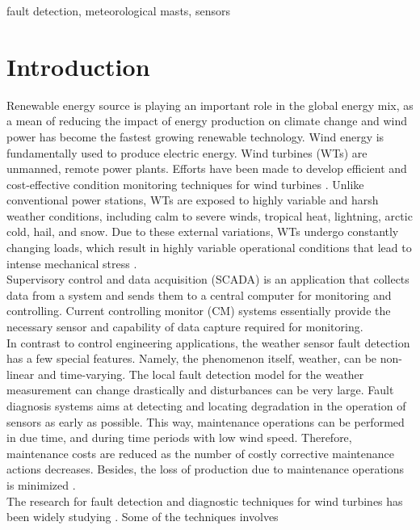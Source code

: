 \documentclass[conference]{IEEEtran}
\begin{document}
\begin{IEEEkeywords}
fault detection, meteorological masts, sensors
\end{IEEEkeywords}

\section{Introduction}
Renewable energy source is playing an important role in the global energy mix, as a mean of reducing the impact of energy production on climate change and wind power has become the fastest growing renewable technology. 
Wind energy is fundamentally used to produce electric energy. Wind turbines (WTs) are unmanned, remote power plants.  Efforts have been made to develop efficient and cost-effective condition monitoring techniques for wind turbines \cite{yang2014wind}. Unlike conventional power stations, WTs are exposed to highly variable and harsh weather conditions, including calm to severe winds, tropical heat, lightning, arctic cold, hail, and snow. Due to these external variations, WTs undergo constantly changing loads, which result in highly variable operational conditions that lead to intense mechanical stress \cite{ribrant2006thesis}. \\
Supervisory control and data acquisition (SCADA) is an application that collects data from a system and sends them to a central computer for monitoring and controlling. Current controlling monitor (CM) systems essentially provide the necessary sensor and capability of data capture required for monitoring.\\
In contrast to control engineering applications, the weather sensor fault detection has a few special features. Namely, the phenomenon itself, weather, can be non-linear and time-varying. The local fault detection model for the weather measurement can change drastically and disturbances can be very large. Fault diagnosis systems aims at detecting and locating degradation in the operation of sensors as early as possible. This way, maintenance operations can be performed in due time, and during time periods with low wind speed. Therefore, maintenance costs are reduced as the number of costly corrective maintenance actions decreases. Besides, the loss of production due to maintenance operations is minimized \cite{luo2014wind}.\\
The research for  fault detection and diagnostic techniques for wind turbines has been widely studying  \cite{tchakoua2014wind,wymore2015survey,lu2009review}. Some of the techniques involves
\end{document}
